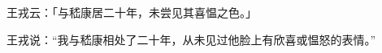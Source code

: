 
\switchcolumn*[\section{}]

王戎云：「与嵇康居二十年，未尝见其喜愠之色。」

\switchcolumn


王戎说：“我与嵇康相处了二十年，从未见过他脸上有欣喜或愠怒的表情。”
